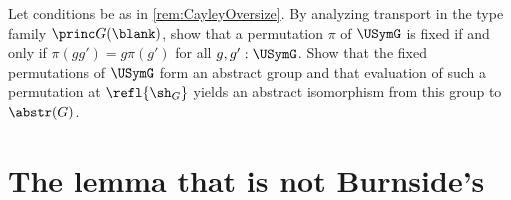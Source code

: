 \begin{xca}\label{xca:PP-fixed-permutations}
Let conditions be as in \cref{rem:CayleyOversize}.
By analyzing transport in the type family $\princ G(\blank)$,
show that a permutation $\pi$ of $\USymG$
is fixed if and only if $\pi(gg')=g\pi(g')$ for all $g,g':\USymG$.
Show that the fixed permutations of $\USymG$ form an abstract group
and that evaluation of such a permutation at $\refl{\sh_G}$
yields an abstract isomorphism from this group to $\abstr(G)$.
\end{xca}

\section{The lemma that is not Burnside's}
\label{sec:burnsides-lemma}
\label{lem:burnsides-lemma}

